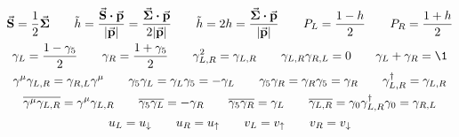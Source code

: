 \begin{gather*}
        \va{S} = \frac{1}{2}\va*{\Sigma}
        \qquad
        \tilde{h}
        = \frac{\va{S}\vdot\va{p}}{\abs{\va{p}}}
        = \frac{\va*{\Sigma}\vdot\va{p}}{2\abs{\va{p}}}
        \qquad
        \tilde{h}
        = 2h
        = \frac{\va*{\Sigma}\vdot\va{p}}{\abs{\va{p}}}
        \qquad
        P_L = \frac{1 - h}{2}
        \qquad
        P_R = \frac{1 + h}{2}
        \\
        \gamma_L = \frac{1 - \gamma_5}{2}
        \qquad
        \gamma_R = \frac{1 + \gamma_5}{2}
        \qquad
        \gamma_{L,R}^2 = \gamma_{L,R}
        \qquad
        \gamma_{L,R}\gamma_{R,L} = 0
        \qquad
        \gamma_L + \gamma_R = \1
        \\
        \gamma^\mu\gamma_{L,R} = \gamma_{R,L}\gamma^\mu
        \qquad
        \gamma_5\gamma_{L} = \gamma_{L}\gamma_5 = -\gamma_{L}
        \qquad
        \gamma_5\gamma_{R} = \gamma_{R}\gamma_5 = \gamma_{R}
        \qquad
        \gamma_{L,R}^\dagger = \gamma_{L,R}
        \\
        \overline{\gamma^\mu\gamma_{L,R}} = \gamma^\mu\gamma_{L,R}
        \qquad
        \overline{\gamma_5\gamma_{L}} = -\gamma_{R}
        \qquad
        \overline{\gamma_5\gamma_{R}} = \gamma_{L}
        \qquad
        \overline{\gamma_{L,R}}
        = \gamma_0\gamma_{L,R}^\dagger\gamma_0
        = \gamma_{R,L}
        \\
        u_L = u_\downarrow
        \qquad
        u_R = u_\uparrow
        \qquad
        v_L = v_\uparrow
        \qquad
        v_R = v_\downarrow
\end{gather*}

